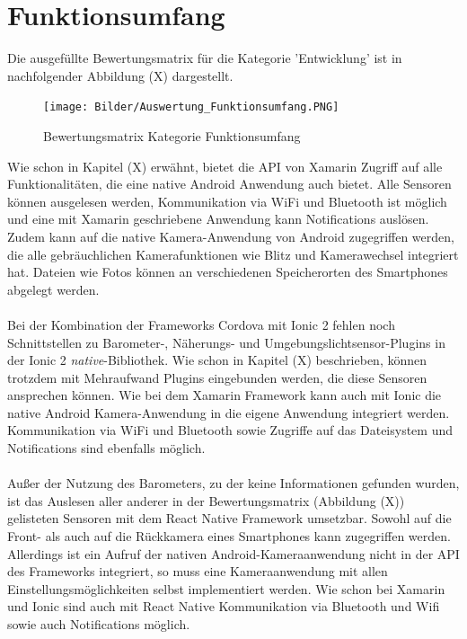 \section{Funktionsumfang}

Die ausgefüllte Bewertungsmatrix für die Kategorie 'Entwicklung' ist in nachfolgender Abbildung (X) dargestellt.

\begin{figure}[h]
	\centering
	\texttt{[image: Bilder/Auswertung\_Funktionsumfang.PNG]}
	\caption{Bewertungsmatrix Kategorie Funktionsumfang}
	\label{fig:AuswFunktion}
\end{figure}

Wie schon in Kapitel (X) erwähnt, bietet die API von Xamarin Zugriff auf alle Funktionalitäten, die eine native Android Anwendung auch bietet. Alle Sensoren können ausgelesen werden, Kommunikation via WiFi und Bluetooth ist möglich und eine mit Xamarin geschriebene Anwendung kann Notifications auslösen. Zudem kann auf die native Kamera-Anwendung von Android zugegriffen werden, die alle gebräuchlichen Kamerafunktionen wie Blitz und Kamerawechsel integriert hat. Dateien wie Fotos können an verschiedenen Speicherorten des Smartphones abgelegt werden. 
\\
\\
Bei der Kombination der Frameworks Cordova mit Ionic 2 fehlen noch Schnittstellen zu Barometer-, Näherungs- und Umgebungslichtsensor-Plugins in der Ionic 2 \textit{native}-Bibliothek. Wie schon in Kapitel (X) beschrieben, können trotzdem mit Mehraufwand Plugins eingebunden werden, die diese Sensoren ansprechen können. Wie bei dem Xamarin Framework kann auch mit Ionic die native Android Kamera-Anwendung in die eigene Anwendung integriert werden. Kommunikation via WiFi und Bluetooth sowie Zugriffe auf das Dateisystem und Notifications sind ebenfalls möglich. 
\\
\\
Außer der Nutzung des Barometers, zu der keine Informationen gefunden wurden, ist das Auslesen aller anderer in der Bewertungsmatrix (Abbildung (X)) gelisteten Sensoren mit dem React Native Framework umsetzbar. Sowohl auf die Front- als auch auf die Rückkamera eines Smartphones kann zugegriffen werden. Allerdings ist ein Aufruf der nativen Android-Kameraanwendung nicht in der API des Frameworks integriert, so muss eine Kameraanwendung mit allen Einstellungsmöglichkeiten selbst implementiert werden. Wie schon bei Xamarin und Ionic sind auch mit React Native Kommunikation via Bluetooth und Wifi sowie auch Notifications möglich. 
\clearpage

